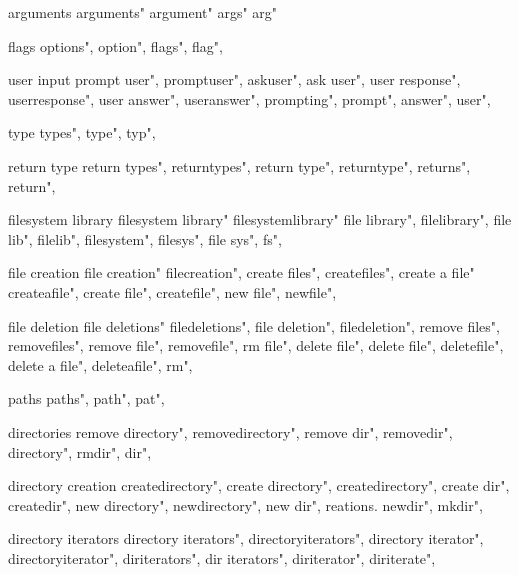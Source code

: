          arguments 
        arguments"
        argument"
        args"
        arg"
        
         flags 
        options",
        option",
        flags",
        flag",
        
         user input 
        prompt user",  
        promptuser",  
        askuser",  
        ask user",  
        user response",  
        userresponse",  
        user answer",  
        useranswer",  
        prompting",  
        prompt",  
        answer",  
        user",  
        
         type 
        types",  
        type",  
        typ",  
        
         return type 
        return types", 
        returntypes", 
        return type", 
        returntype", 
        returns", 
        return", 
        
         filesystem library
        filesystem library"
        filesystemlibrary"
        file library",
        filelibrary",
        file lib", 
        filelib",
        filesystem",
        filesys",
        file sys",
        fs",
         
         file creation 
        file creation"
        filecreation",
        create files",
        createfiles", 
        create a file"
        createafile",
        create file", 
        createfile",
        new file", 
        newfile", 
        
         file deletion 
        file deletions"
        filedeletions",
        file deletion",
        filedeletion", 
        remove files", 
        removefiles",
        remove file",
        removefile",
        rm file",
        delete file",
        delete file",
        deletefile",
        delete a file",
        deleteafile",
        rm",
        
         paths 
        paths", 
        path", 
        pat",
        
         directories
        remove directory",
        removedirectory",
        remove dir",
        removedir",
        directory",
        rmdir",
        dir",

         directory creation
        createdirectory",  
        create directory",  
        createdirectory",  
        create dir",  
        createdir",  
        new directory",  
        newdirectory",  
        new dir", reations. 
        newdir",  
        mkdir",  
        
         directory iterators 
        directory iterators",  
        directoryiterators",  
        directory iterator",  
        directoryiterator",  
        diriterators",  
        dir iterators",  
        diriterator",  
        diriterate",  
        
